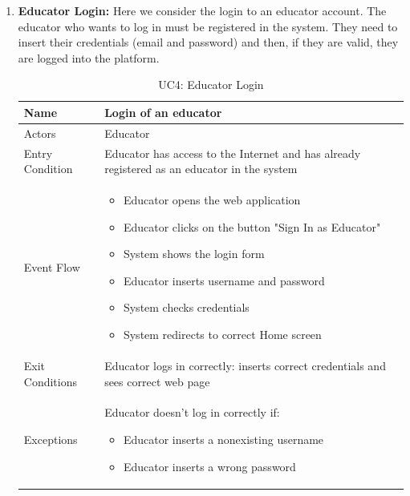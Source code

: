 \begin{enumerate}
   \item \textbf{Educator Login:}
    Here we consider the login to an educator account. The educator who wants to log in must be registered in the system. They need to insert their credentials (email and password) and then, if they are valid, they are logged into the platform.
    
   \begin{table}[H]
       \centering
       \begin{tabular}{|l|m{11cm}|}
        \hline
            Name & Login of an educator\\
        \hline
            Actors & Educator\\
        \hline
            Entry Condition & Educator has access to the Internet and has already registered as an educator in the system\\
        \hline
            Event Flow & 
            \begin{itemize}
                \item Educator opens the web application
                \item Educator clicks on the button "Sign In as Educator"
                \item System shows the login form
                \item Educator inserts username and password
                \item System checks credentials
                \item System redirects to correct Home screen        
            \end{itemize} \\
        \hline
            Exit Conditions & Educator logs in correctly: inserts correct credentials and sees correct web page\\
        \hline
            Exceptions & Educator doesn't log in correctly if:
            \begin{itemize}
                \item Educator inserts a nonexisting username
                \item Educator inserts a wrong password
            \end{itemize} \\
        \hline
       \end{tabular}
       \caption{UC4: Educator Login}
       \label{tab:uc4}
   \end{table}

   \newpage
   

\end{enumerate}
